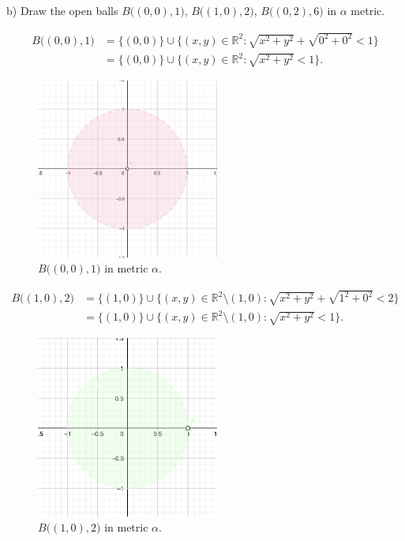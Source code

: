 \documentclass[a4paper,11pt]{article}
\begin{document}

b) Draw the open balls $B \big((0, 0), 1 \big)$, $B \big((1, 0), 2 \big)$, $B \big((0, 2), 6 \big)$ in $\alpha$ metric. 

\begin{align*} 
    B \big((0, 0), 1 \big) &= \{(0,0)\} \cup \{(x,y) \in \mathbb{R}^2 : \sqrt{x^2 + y^2} + \sqrt{0^2 + 0^2}< 1 \} 
    \\
    &= \{(0,0)\} \cup \{(x,y) \in \mathbb{R}^2 : \sqrt{x^2 + y^2} < 1 \}. 
\end{align*}

\begin{figure}[ht!]
    \centering
    \includegraphics[width=60mm]{b1.png}
    \caption{$B \big((0, 0), 1 \big)$ in metric $\alpha$.}
\end{figure}


\begin{align*} 
    B \big((1, 0), 2 \big) &= \{(1,0)\} \cup \{(x,y) \in \mathbb{R}^2 \setminus (1,0) : \sqrt{x^2 + y^2} + \sqrt{1^2 + 0^2} < 2 \}
    \\
    &= \{(1,0)\} \cup \{(x,y) \in \mathbb{R}^2 \setminus (1,0) : \sqrt{x^2 + y^2} < 1 \} .
\end{align*}

\begin{figure}[ht!]
    \centering
    \includegraphics[width=60mm]{b2.png}
    \caption{$B \big((1, 0), 2 \big)$ in metric $\alpha$.}
\end{figure}
\end{document}
